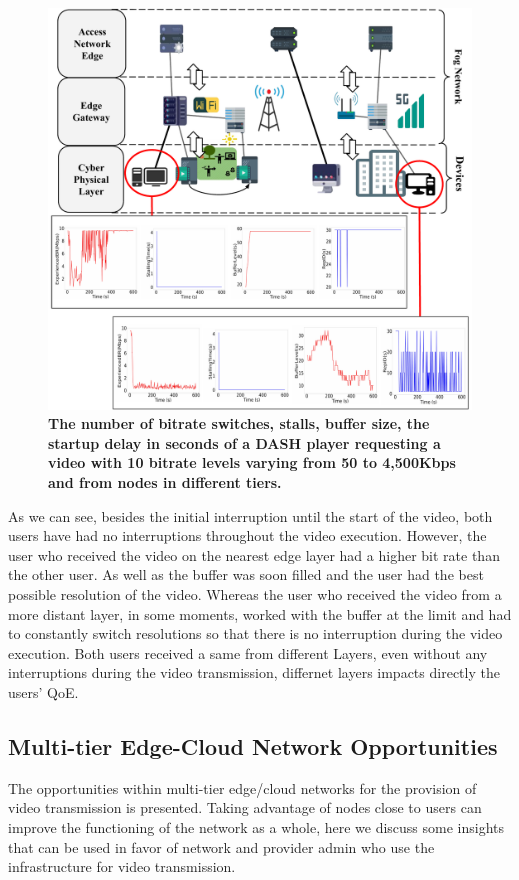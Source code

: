 \begin{figure}
    \centering
    \includegraphics[width=0.9\linewidth]{images/qoe-multi-level.pdf}
    \caption{\textbf{The number of bitrate switches, stalls, buffer size, the startup delay in seconds of a DASH player requesting a video with 10 bitrate levels varying from 50 to 4,500Kbps and from nodes in different tiers.}}
    \label{fig:impact-two-layers}
\end{figure}


As we can see, besides the initial interruption until the start of the video, both users have had no interruptions throughout the video execution. However, the user who received the video on the nearest edge layer had a higher bit rate than the other user. As well as the buffer was soon filled and the user had the best possible resolution of the video. Whereas the user who received the video from a more distant layer, in some moments, worked with the buffer at the limit and had to constantly switch resolutions so that there is no interruption during the video execution. Both users received a same from different Layers, even without any interruptions during the video transmission, differnet layers impacts directly the users' QoE.


\subsection{Multi-tier Edge-Cloud Network Opportunities}

The opportunities within multi-tier edge/cloud networks for the provision of video transmission is presented. Taking advantage of nodes close to users can improve the functioning of the network as a whole, here we discuss some insights that can be used in favor of network and provider admin who use the infrastructure for video transmission.

